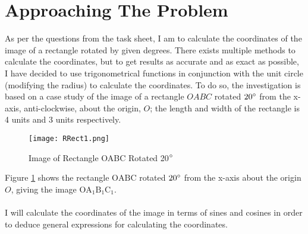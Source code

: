 \documentclass{article}
\begin{document}
    \newpage
    \section{Approaching The Problem} As per the questions from the task sheet, I am to calculate the coordinates of the image of a rectangle rotated by given degrees. There exists multiple methods to calculate the coordinates, but to get results as accurate and as exact as possible, I have decided to use trigonometrical functions in conjunction with the unit circle (modifying the radius) to calculate the coordinates. To do so, the investigation is based on a case study of the image of a rectangle $OABC$ rotated $20\degree$ from the x-axis, anti-clockwise, about the origin, $O$; the length and width of the rectangle is 4 units and 3 units respectively.
    \begin{figure}[h!]
        \texttt{[image: RRect1.png]}
        \caption{Image of Rectangle OABC Rotated 20$\degree$}
        \label{fig:rrect1}
    \end{figure} \newline
    Figure \ref{fig:rrect1} shows the rectangle $\mathrm{OABC}$ rotated $20\degree$ from the x-axis about the origin $O$, giving the image $\mathrm{OA_1B_1C_1}$.
    \\\\
    I will calculate the coordinates of the image in terms of sines and cosines in order to deduce general expressions for calculating the coordinates.
    \newpage
\end{document}
